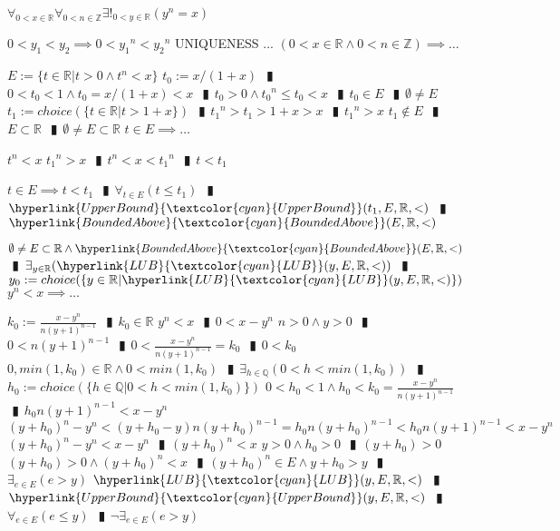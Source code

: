 \documentclass{book}
\newcommand{\wff}[1]{\hypertarget{#1}{\fbox{\textcolor{red}{$#1$}}\phantom{--}}}
\newcommand{\rf}[1]{\hyperlink{#1}{\textcolor{cyan}{#1}}}
\newcommand{\abr}{:=}
\newcommand{\pipe}{$\phantom{(}\vrectangleblack\phantom{)}$}
\begin{document}
\wff{RootExistenceInR} $\forall_{0 < x \in \mathbb{R}} \forall_{0 < n \in \mathbb{Z}} \exists!_{0 < y \in \mathbb{R}}(y^n = x)$
\begin{enumerate}
  \lit $0 < y_1 < y_2 \implies 0 < {y_1}^n < {y_2}^n$ UNIQUENESS ...
  \lit $(0 < x \in \mathbb{R} \land 0 < n \in \mathbb{Z}) \implies \ldots$
  \begin{enumerate}
    \lit $E \abr \{t \in \mathbb{R} | t > 0 \land t^n < x\}$ 
    \lit $t_0 \abr x / (1 + x)$ \pipe $0 < t_0 < 1 \land t_0 = x / (1 + x) < x$ \pipe $t_0 > 0 \land {t_0}^n \leq t_0 < x$ \pipe $t_0 \in E$ \pipe $\emptyset \neq E$
    \lit $t_1 \abr choice(\{t \in \mathbb{R} | t > 1 + x\})$ \pipe ${t_1}^n > t_1 > 1 + x > x$ \pipe ${t_1}^n > x$
    \lit $t_1 \notin E$ \pipe $E \subset \mathbb{R}$ \pipe $\emptyset \neq E \subset \mathbb{R}$
    \lit $t \in E \implies \ldots$
    \begin{enumerate}
      \lit $t^n < x$
      \lit ${t_1}^n > x$ \pipe $t^n < x < {t_1}^n$ \pipe $t < t_1$
    \end{enumerate}
    \lit $t \in E \implies t < t_1$ \pipe $\forall_{t \in E}(t \leq t_1)$ \pipe $\rf{UpperBound}(t_1, E, \mathbb{R}, <)$ \pipe $\rf{BoundedAbove}(E, \mathbb{R}, <)$
  \end{enumerate}
  \lit $\emptyset \neq E \subset \mathbb{R} \land \rf{BoundedAbove}(E, \mathbb{R}, <)$ \pipe $\exists_{y \in \mathbb{R}}(\rf{LUB}(y, E, \mathbb{R}, <))$ \pipe $y_0 \abr choice(\{y \in \mathbb{R} | \rf{LUB}(y, E, \mathbb{R}, <)\})$
  \lit $y^n < x \implies \ldots$
  \begin{enumerate}
    \lit $k_0 \abr \frac{x - y^n}{n (y + 1)^{n - 1}}$ \pipe $k_0 \in \mathbb{R}$
    \lit $y^n < x$ \pipe $0 < x - y^n$
    \lit $n > 0 \land y > 0$ \pipe $0 < n (y + 1)^{n - 1}$ \pipe $0 < \frac{x - y^n}{n (y + 1)^{n - 1}} = k_0$ \pipe $0 < k_0$
    \lit $0, min(1, k_0) \in \mathbb{R} \land 0 < min(1, k_0)$ \pipe $\exists_{h \in \mathbb{Q}}(0 < h < min(1, k_0))$ \pipe $h_0 \abr choice(\{h \in \mathbb{Q} | 0 < h < min(1, k_0)\})$
    \lit $0 < h_0 < 1 \land h_0 < k_0 = \frac{x - y^n}{n (y + 1)^{n - 1}}$ \pipe $h_0 n (y + 1)^{n - 1} < x - y^n$
    \lit $(y + h_0)^n - y^n < (y + h_0 - y) n (y + h_0)^{n - 1} = h_0 n (y + h_0)^{n - 1} < h_0 n (y + 1)^{n - 1} < x - y^n$
    \lit $(y + h_0)^n - y^n < x - y^n$ \pipe $(y + h_0)^n < x$
    \lit $y > 0 \land h_0 > 0$ \pipe $(y + h_0) > 0$
    \lit $(y + h_0) > 0 \land (y + h_0)^n < x$ \pipe $(y + h_0)^n \in E \land y + h_0 > y$ \pipe $\exists_{e \in E}(e > y)$
    \lit $\rf{LUB}(y, E, \mathbb{R}, <)$ \pipe $\rf{UpperBound}(y, E, \mathbb{R}, <)$ \pipe $\forall_{e \in E}(e \leq y)$ \pipe $\lnot \exists_{e \in E}(e > y)$

\end{enumerate}
\end{enumerate}
\end{document}
